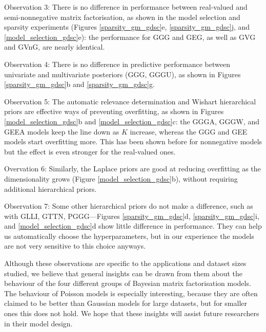 \documentclass[letterpaper]{article} %
\begin{document}
	Observation 3: There is no difference in performance between real-valued and semi-nonnegative matrix factorisation, as shown in the model selection and sparsity experiments (Figures \ref{sparsity_gm_gdsc}e, \ref{sparsity_gm_gdsc}j, and \ref{model_selection_gdsc}e): the performance for GGG and GEG, as well as GVG and GVnG, are nearly identical.
		
	Observation 4: There is no difference in predictive performance between univariate and multivariate posteriors (GGG, GGGU), as shown in Figures \ref{sparsity_gm_gdsc}b and \ref{sparsity_gm_gdsc}g.
		
	Observation 5: The automatic relevance determination and Wishart hierarchical priors are effective ways of preventing overfitting, as shown in Figures \ref{model_selection_gdsc}b and \ref{model_selection_gdsc}c: the GGGA, GGGW, and GEEA models keep the line down as $K$ increase, whereas the GGG and GEE models start overfitting more. This has been shown before for nonnegative models \cite{Brouwer2017b} but the effect is even stronger for the real-valued ones. 
		
	Overvation 6: Similarly, the Laplace priors are good at reducing overfitting as the dimensionality grows (Figure \ref{model_selection_gdsc}b), without requiring additional hierarchical priors.
		
	Observation 7: Some other hierarchical priors do not make a difference, such as with GLLI, GTTN, PGGG---Figures \ref{sparsity_gm_gdsc}d, \ref{sparsity_gm_gdsc}i, and \ref{model_selection_gdsc}d show little difference in performance. They can help us automatically choose the hyperparameters, but in our experience the models are not very sensitive to this choice anyways. 
	
	Although these observations are specific to the applications and dataset sizes studied, we believe that general insights can be drawn from them about the behaviour of the four different groups of Bayesian matrix factorisation models. The behaviour of Poisson models is especially interesting, because they are often claimed to be better than Gaussian models for large datasets, but for smaller ones this does not hold. We hope that these insights will assist future researchers in their model design.


%
\end{document}
